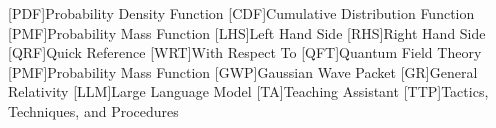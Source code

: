 [PDF]{Probability Density Function}
[CDF]{Cumulative Distribution Function}
[PMF]{Probability Mass Function}
[LHS]{Left Hand Side}
[RHS]{Right Hand Side}
[QRF]{Quick Reference}
[WRT]{With Respect To}
[QFT]{Quantum Field Theory}
[PMF]{Probability Mass Function}
[GWP]{Gaussian Wave Packet}
[GR]{General Relativity}
[LLM]{Large Language Model}
[TA]{Teaching Assistant}
[TTP]{Tactics, Techniques, and Procedures}
